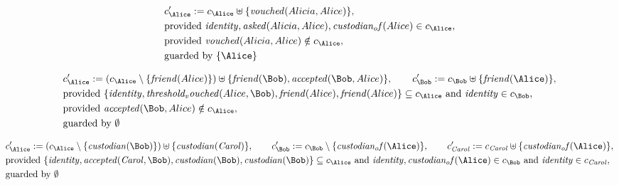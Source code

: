 \begin{align*}
&
c'_
{
\Alice
}
 := 
c_
{
\Alice
}
 \uplus 
\{
\mathit{
vouched
}
(
Alicia
,
Alice
)
\}
,\\
&
\text{provided } 
\mathit{
identity
}
,
\mathit{
asked
}
(
Alicia
,
Alice
)
,
\mathit{
custodian_of
}
(
Alice
)
 \in c_
{
\Alice
}
,\\
&
\text{provided } 
\mathit{
vouched
}
(
Alicia
,
Alice
)
 \notin c_
{
\Alice
}
,\\
&
\text{guarded by } \{
\Alice
\}
\end{align*}

\begin{align*}
&
c'_
{
\Alice
}
 := 
(c_
{
\Alice
}
 \setminus 
\{
\mathit{
friend
}
(
Alice
)
\}
) \uplus 
\{
\mathit{
friend
}
(
\Bob
)
,
\mathit{
accepted
}
(
\Bob
,
Alice
)
\}
, \qquad 
c'_
{
\Bob
}
 := 
c_
{
\Bob
}
 \uplus 
\{
\mathit{
friend
}
(
\Alice
)
\}
,\\
&
\text{provided } 
\{
\mathit{
identity
}
,
\mathit{
threshold_vouched
}
(
Alice
,
\Bob
)
,
\mathit{
friend
}
(
Alice
)
,
\mathit{
friend
}
(
Alice
)
\}
 \subseteq c_
{
\Alice
}
 \text{ and } 
\mathit{
identity
}
 \in c_
{
\Bob
}
,\\
&
\text{provided } 
\mathit{
accepted
}
(
\Bob
,
Alice
)
 \notin c_
{
\Alice
}
,\\
&
\text{guarded by } \emptyset
\end{align*}

\begin{align*}
&
c'_
{
\Alice
}
 := 
(c_
{
\Alice
}
 \setminus 
\{
\mathit{
custodian
}
(
\Bob
)
\}
) \uplus 
\{
\mathit{
custodian
}
(
\mathit{Carol}
)
\}
, \qquad 
c'_
{
\Bob
}
 := 
c_
{
\Bob
}
 \setminus 
\{
\mathit{
custodian_of
}
(
\Alice
)
\}
, \qquad 
c'_
{
\mathit{Carol}
}
 := 
c_
{
\mathit{Carol}
}
 \uplus 
\{
\mathit{
custodian_of
}
(
\Alice
)
\}
,\\
&
\text{provided } 
\{
\mathit{
identity
}
,
\mathit{
accepted
}
(
\mathit{Carol}
,
\Bob
)
,
\mathit{
custodian
}
(
\Bob
)
,
\mathit{
custodian
}
(
\Bob
)
\}
 \subseteq c_
{
\Alice
}
 \text{ and } 
\mathit{
identity
}
,
\mathit{
custodian_of
}
(
\Alice
)
 \in c_
{
\Bob
}
 \text{ and } 
\mathit{
identity
}
 \in c_
{
\mathit{Carol}
}
,\\
&
\text{guarded by } \emptyset
\end{align*}
